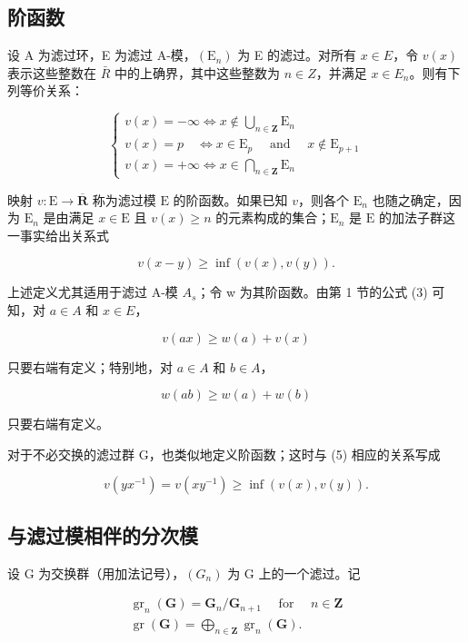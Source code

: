 \subsection{阶函数}

	设 A 为滤过环，E 为滤过 A-模，\((\mathrm{E}_{n})\) 为 E 的滤过。对所有 \(x \in E\)，令 \(v(x)\) 表示这些整数在 \(\bar{R}\) 中的上确界，其中这些整数为 \(n \in Z\)，并满足 \(x \in E_{n}\)。则有下列等价关系：

\[
\left\{ \begin{array}{l} v (x) = - \infty \Leftrightarrow x \notin \bigcup_ {n \in \mathbf {Z}} \mathrm{E} _ {n} \\ v (x) = p \quad \Leftrightarrow x \in \mathrm{E} _ {p} \quad \text { and } \quad x \notin \mathrm{E} _ {p + 1} \\ v (x) = + \infty \Leftrightarrow x \in \bigcap_ {n \in \mathbf {Z}} \mathrm{E} _ {n} \end{array} \right.\tag{4}
\]

	映射 \(v: \mathrm{E} \to \overline{\mathbf{R}}\) 称为滤过模 \(\mathrm{E}\) 的阶函数。如果已知 \(v\)，则各个 \(\mathrm{E}_n\) 也随之确定，因为 \(\mathrm{E}_n\) 是由满足 \(x \in \mathrm{E}\) 且 \(v(x) \geqslant n\) 的元素构成的集合；\(\mathrm{E}_n\) 是 \(\mathrm{E}\) 的加法子群这一事实给出关系式

\[
v (x - y) \geqslant \inf (v (x), v (y)).\tag{5}
\]

上述定义尤其适用于滤过 A-模 \(A_{s}\)；令 w 为其阶函数。由第 1 节的公式 (3) 可知，对 \(a \in A\) 和 \(x \in E\)，

\[
v (a x) \geqslant w (a) + v (x)\tag{6}
\]

只要右端有定义；特别地，对 \(a \in A\) 和 \(b \in A\)，

\[
w (a b) \geqslant w (a) + w (b)\tag{7}
\]

只要右端有定义。

对于不必交换的滤过群 G，也类似地定义阶函数；这时与 (5) 相应的关系写成

\[
v (y x ^ {- 1}) = v (x y ^ {- 1}) \geqslant \inf (v (x), v (y)).\tag{5'}
\]

\subsection{与滤过模相伴的分次模}

设 G 为交换群（用加法记号），\((G_{n})\) 为 G 上的一个滤过。记

\[
\begin{array}{l} \operatorname{gr} _ {n} (\mathbf {G}) = \mathbf {G} _ {n} / \mathbf {G} _ {n + 1} \quad \text { for } \quad n \in \mathbf {Z} \\ \operatorname{gr} (\mathbf {G}) = \bigoplus_ {n \in \mathbf {Z}} \operatorname{gr} _ {n} (\mathbf {G}). \end{array}\tag{8}
\]

